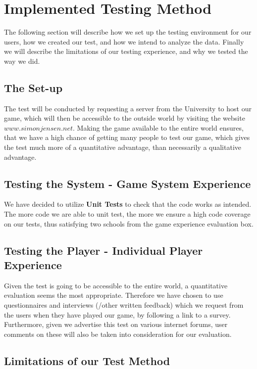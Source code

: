\section{Implemented Testing Method}
\label{sec:test_method}

The following section will describe how we set up the testing environment for our users, how we created our test, and how we intend to analyze the data.
Finally we will describe the limitations of our testing experience, and why we tested the way we did.

\subsection{The Set-up}

The test will be conducted by requesting a server from the University to host our game, which will then be accessible to the outside world by visiting the website $www.simonjensen.net$.
Making the game available to the entire world ensures, that we have a high chance of getting many people to test our game, which gives the test much more of a quantitative advantage, than necessarily a qualitative advantage.

\subsection{Testing the System - Game System Experience}

We have decided to utilize \textbf{Unit Tests} to check that the code works as intended.
The more code we are able to unit test, the more we ensure a high code coverage on our tests, thus satisfying two schools from the game
experience evaluation box.

\subsection{Testing the Player - Individual Player Experience}

Given the test is going to be accessible to the entire world, a quantitative evaluation seems the most appropriate. Therefore we have chosen to use questionnaires and interviews (/other written feedback) which we request from the users when they have played our game, by following a link to a survey. Furthermore, given we advertise this test on various internet forums, user comments on these will also be taken into consideration for our evaluation.

\subsection{Limitations of our Test Method}

